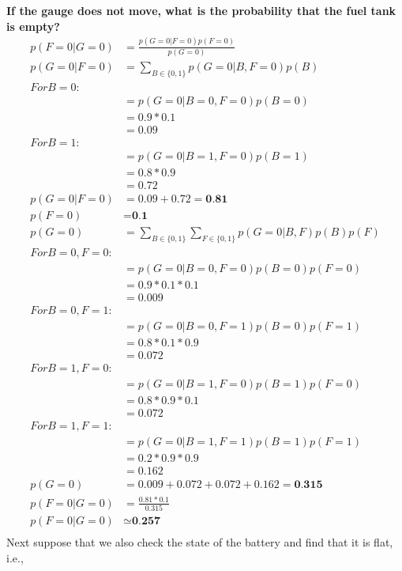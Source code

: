 \textbf{If the gauge does not move, what is the probability that the fuel tank is empty?} \\
\begin{align*}
p(F=0|G=0) & =\frac{p(G=0|F=0)p(F=0)}{p(G=0)} \\
    p(G=0|F=0) & = \sum_{B\in \{0,1\}} p(G=0|B,F=0)p(B) \\
    For B=0: \\
    & = p(G=0|B=0,F=0)p(B=0) \\    
    & = 0.9 * 0.1 \\
    & = 0.09 \\
    For B=1: \\
    &= p(G=0|B=1,F=0)p(B=1) \\   
    & = 0.8 * 0.9 \\
    & = 0.72 \\
p(G=0|F=0) & = 0.09 + 0.72 = \textbf{0.81} \\  
p(F=0) & = \textbf{0.1} \\
p(G=0) & =  \sum_{B\in \{0,1\}}  \sum_{F\in \{0,1\}}  p(G=0|B,F)  p(B)  p(F) \\ 
For B=0, F=0: \\
     & = p(G=0|B=0,F=0)  p(B=0)  p(F=0) \\
    &= 0.9 * 0.1 * 0.1 \\
    & = 0.009 \\
For B=0, F=1: \\
     & = p(G=0|B=0,F=1)  p(B=0)  p(F=1) \\
    &= 0.8 * 0.1 * 0.9 \\
    & = 0.072 \\
For B=1, F=0: \\
     & = p(G=0|B=1,F=0)  p(B=1)  p(F=0) \\
    &= 0.8 * 0.9 * 0.1 \\
    & = 0.072 \\ 
For B=1, F=1: \\
     & = p(G=0|B=1,F=1)  p(B=1)  p(F=1) \\
    &= 0.2 * 0.9 * 0.9 \\
    & = 0.162 \\    
p(G=0) &= 0.009 + 0.072 + 0.072 + 0.162 = \textbf{0.315} \\
p(F=0|G=0) & =\frac{0.81*0.1}{0.315} \\
p(F=0|G=0) & \simeq \textbf{0.257} \\
\end{align*}
Next suppose that we also check the state of the battery and find that it is flat, i.e.,
